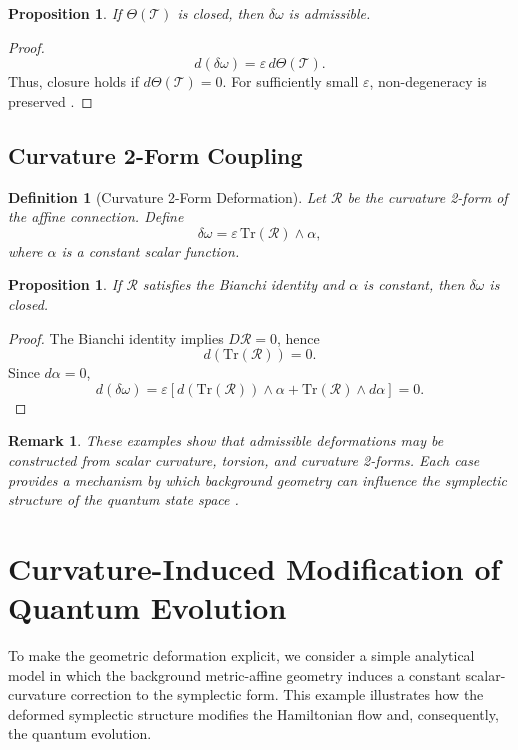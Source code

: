 \documentclass[11pt, a4paper]{article}
\newtheorem{proposition}[theorem]{Proposition}
\newtheorem{definition}[theorem]{Definition}
\newtheorem{remark}[theorem]{Remark}
\begin{document}
\begin{proposition}
If $\Theta(\mathcal{T})$ is closed, then $\delta\omega$ is admissible.
\end{proposition}

\begin{proof}
\[
d(\delta\omega) = \varepsilon\, d\Theta(\mathcal{T}).
\]
Thus, closure holds if $d\Theta(\mathcal{T}) = 0$. For sufficiently small
$\varepsilon$, non-degeneracy is preserved \cite{shapiro2002}.
\end{proof}

\subsection{Curvature 2-Form Coupling}

\begin{definition}[Curvature 2-Form Deformation]
Let $\mathcal{R}$ be the curvature 2-form of the affine connection.
Define
\[
\delta\omega = \varepsilon\, \mathrm{Tr}(\mathcal{R}) \wedge \alpha,
\]
where $\alpha$ is a constant scalar function.
\end{definition}

\begin{proposition}
If $\mathcal{R}$ satisfies the Bianchi identity and $\alpha$ is constant,
then $\delta\omega$ is closed.
\end{proposition}

\begin{proof}
The Bianchi identity implies $D\mathcal{R} = 0$, hence
\[
d(\mathrm{Tr}(\mathcal{R})) = 0.
\]
Since $d\alpha = 0$,
\[
d(\delta\omega)
= \varepsilon \left[d(\mathrm{Tr}(\mathcal{R})) \wedge \alpha
+ \mathrm{Tr}(\mathcal{R}) \wedge d\alpha \right]
= 0.
\]
\end{proof}

\begin{remark}
These examples show that admissible deformations may be constructed from
scalar curvature, torsion, and curvature 2-forms. Each case provides a
mechanism by which background geometry can influence the symplectic
structure of the quantum state space \cite{simon1983,berry1984}.
\end{remark}




\section{Curvature-Induced Modification of Quantum Evolution}

To make the geometric deformation explicit, we consider a simple analytical
model in which the background metric-affine geometry induces a constant
scalar-curvature correction to the symplectic form. This example illustrates
how the deformed symplectic structure modifies the Hamiltonian flow and,
consequently, the quantum evolution.
\end{document}
